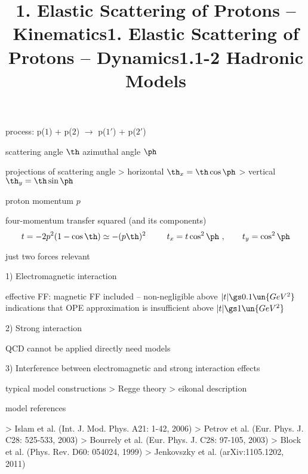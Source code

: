 

\newpage%
\title{1. Elastic Scattering of Protons -- Kinematics}

\> process: p($1$) + p($2$) $\longrightarrow$ p($1'$) + p($2'$)


\> scattering angle $\th$
\> azimuthal angle $\ph$

\> projections of scattering angle
\>> horizontal $\th_x = \th \cos\ph$
\>> vertical $\th_y = \th \sin\ph$

\> proton momentum $p$

\> four-momentum transfer squared (and its components)
$$t = -2p^2 (1 - \cos\th) \simeq -(p\th)^2\ \,\qquad t_x = t \cos^2\ph\ ,\qquad t_y = \cos^2\ph$$

\newpage%
\title{1. Elastic Scattering of Protons -- Dynamics}

\> just two forces relevant

1) Electromagnetic interaction

\> effective FF: magnetic FF included -- non-negligible above $|t|\gs 0.1\un{GeV^2}$
\> indications that OPE approximation is insufficient above $|t| \gs 1\un{GeV^2}$

\centerline{}
\centerline{}

2) Strong interaction

\> QCD cannot be applied directly
\> need models

3) Interference between electromagnetic and strong interaction effects

\newpage%
\title{1.1-2 Hadronic Models}


\> typical model constructions
\>> Regge theory
\>> eikonal description

\> model references

\>> Islam et al. (Int. J. Mod. Phys. A21: 1-42, 2006)
\>> Petrov et al. (Eur. Phys. J. C28: 525-533, 2003)
\>> Bourrely et al. (Eur. Phys. J. C28: 97-105, 2003)
\>> Block et al. (Phys. Rev. D60: 054024, 1999)
\>> Jenkovszky et al. (arXiv:1105.1202, 2011)

